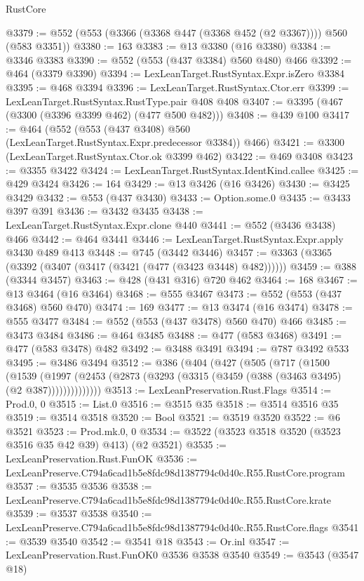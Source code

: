\begin{lexlean}{RustCore}
\begin{coremodule}
@3379 := @552 (@553 (@3366 (@3368 @447 (@3368 @452 (@2 @3367)))) @560 (@583 @3351))
@3380 := 163
@3383 := @13 @3380 (@16 @3380)
@3384 := @3346 @3383
@3390 := @552 (@553 (@437 @3384) @560 @480) @466
@3392 := @464 (@3379 @3390)
@3394 := LexLeanTarget.RustSyntax.Expr.isZero @3384
@3395 := @468 @3394
@3396 := LexLeanTarget.RustSyntax.Ctor.err
@3399 := LexLeanTarget.RustSyntax.RustType.pair @408 @408
@3407 := @3395 (@467 (@3300 (@3396 @3399 @462) (@477 @500 @482)))
@3408 := @439 @100
@3417 := @464 (@552 (@553 (@437 @3408) @560 (LexLeanTarget.RustSyntax.Expr.predecessor @3384)) @466)
@3421 := @3300 (LexLeanTarget.RustSyntax.Ctor.ok @3399 @462)
@3422 := @469 @3408
@3423 := @3355 @3422
@3424 := LexLeanTarget.RustSyntax.IdentKind.callee
@3425 := @429 @3424
@3426 := 164
@3429 := @13 @3426 (@16 @3426)
@3430 := @3425 @3429
@3432 := @553 (@437 @3430)
@3433 := Option.some.{0}
@3435 := @3433 @397 @391
@3436 := @3432 @3435
@3438 := LexLeanTarget.RustSyntax.Expr.clone @440
@3441 := @552 (@3436 @3438) @466
@3442 := @464 @3441
@3446 := LexLeanTarget.RustSyntax.Expr.apply @3430 @489 @413
@3448 := @745 (@3442 @3446)
@3457 := @3363 (@3365 (@3392 (@3407 (@3417 (@3421 (@477 (@3423 @3448) @482))))))
@3459 := @388 (@3344 @3457)
@3463 := @428 (@431 @316) @720 @462
@3464 := 168
@3467 := @13 @3464 (@16 @3464)
@3468 := @555 @3467
@3473 := @552 (@553 (@437 @3468) @560 @470)
@3474 := 169
@3477 := @13 @3474 (@16 @3474)
@3478 := @555 @3477
@3484 := @552 (@553 (@437 @3478) @560 @470) @466
@3485 := @3473 @3484
@3486 := @464 @3485
@3488 := @477 (@583 @3468)
@3491 := @477 (@583 @3478) @482
@3492 := @3488 @3491
@3494 := @787 @3492 @533
@3495 := @3486 @3494
@3512 := @386
    (@404
      (@427
        (@505
          (@717
            (@1500
              (@1539
                (@1997 (@2453 (@2873 (@3293 (@3315 (@3459 (@388 (@3463 @3495) (@2 @387))))))))))))))
@3513 := LexLeanPreservation.Rust.Flags
@3514 := Prod.{0, 0}
@3515 := List.{0}
@3516 := @3515 @35
@3518 := @3514 @3516 @35
@3519 := @3514 @3518
@3520 := Bool
@3521 := @3519 @3520
@3522 := @6 @3521
@3523 := Prod.mk.{0, 0}
@3534 := @3522 (@3523 @3518 @3520 (@3523 @3516 @35 @42 @39) @413) (@2 @3521)
@3535 := LexLeanPreservation.Rust.FunOK
@3536 := LexLeanPreserve.C794a6cad1b5e8fdc98d1387794c0d40c.R55.RustCore.program
@3537 := @3535 @3536
@3538 := LexLeanPreserve.C794a6cad1b5e8fdc98d1387794c0d40c.R55.RustCore.krate
@3539 := @3537 @3538
@3540 := LexLeanPreserve.C794a6cad1b5e8fdc98d1387794c0d40c.R55.RustCore.flags
@3541 := @3539 @3540
@3542 := @3541 @18
@3543 := Or.inl
@3547 := LexLeanPreservation.Rust.FunOK0 @3536 @3538 @3540
@3549 := @3543 (@3547 @18)

\end{coremodule}
\end{lexlean}
